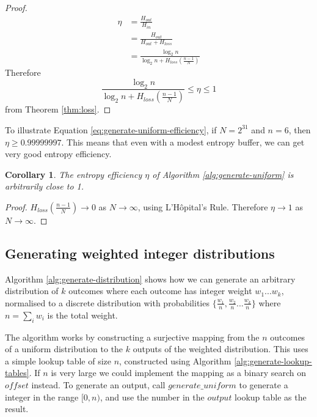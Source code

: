 \documentclass[12pt]{article}
\newtheorem{corollary}{Corollary}
\begin{document}
\begin{proof}
\begin{align}
    \eta & = \frac{H_{out}}{H_{in}} \\
         & = \frac{H_{out}}{H_{out}+H_{loss}} \\
         & = \frac{\log_2n}{\log_2n + H_{loss}(\frac{n-1}{N})}
\end{align}
Therefore 
\begin{equation}
\frac{\log_2n}{\log_2n + H_{loss}(\frac{n-1}{N})} \le \eta \le 1
\end{equation}
from Theorem \ref{thm:loss}.
\end{proof}

To illustrate Equation \ref{eq:generate-uniform-efficiency}, if $N=2^{31}$ and $n=6$, then $\eta \ge 0.99999997$. This means that even with a modest entropy buffer, we can get very good entropy efficiency.

\begin{corollary}
The entropy efficiency $\eta$ of Algorithm \ref{alg:generate-uniform} is arbitrarily close to 1.
\end{corollary}

\begin{proof}
$H_{loss}(\frac{n-1}{N}) \rightarrow 0$ as $N \rightarrow \infty$, using L'H\^opital's Rule. Therefore $\eta \rightarrow 1$ as $N \rightarrow \infty$.
\end{proof}






\subsection{Generating weighted integer distributions}

Algorithm \ref{alg:generate-distribution} shows how we can generate an arbitrary  distribution of $k$ outcomes where each outcome has integer weight ${w_1 ... w_k}$, normalised to a discrete distribution with probabilities $\{\frac{w_1}{n}, \frac{w_2}{n} ... \frac{w_k}{n}\}$ where $n=\sum_i w_i$ is the total weight.

The algorithm works by constructing a surjective mapping from the $n$ outcomes of a uniform distribution to the $k$ outputs of the weighted distribution. This uses a simple lookup table of size $n$, constructed using Algorithm \ref{alg:generate-lookup-tables}. If $n$ is very large we could implement the mapping as a binary search on $offset$ instead. To generate an output, call $generate\_uniform$ to generate a integer in the range $[0,n)$, and use the number in the $output$ lookup table as the result. 
\end{document}

